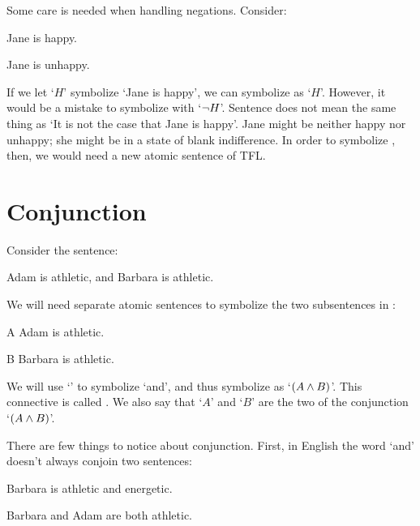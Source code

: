 Some care is needed when handling negations. Consider:
	\begin{earg}
		\item[\ex{not6}] Jane is happy.
		\item[\ex{not7}] Jane is unhappy.
	\end{earg}
If we let `$H$' symbolize  `Jane is happy', we can symbolize  as `$H$'. However, it would be a mistake to symbolize  with `$\neg{H}$'. Sentence  does not mean the same thing as `It is not the case that Jane is happy'. Jane might be neither happy nor unhappy; she might be in a state of blank indifference. In order to symbolize , then, we would need a new atomic sentence of TFL.

\section{Conjunction}\label{s:ConnectiveConjunction}

Consider the sentence:

	\begin{earg}
		\item[\ex{and3}]Adam is athletic, and Barbara is athletic.
	\end{earg}

We will need separate atomic sentences to symbolize the two subsentences in :

	\begin{ekey}
		\item[A] Adam is athletic.
		\item[B] Barbara is athletic.
	\end{ekey}

\noindent We will use `\eand' to symbolize `and', and thus symbolize  as `$(A\wedge B)$'. This connective is called . We also say that `$A$' and `$B$' are the two  of the conjunction `$(A \wedge B)$'.

There are few things to notice about conjunction.  First, in English the word `and' doesn't always conjoin two sentences:

	\begin{earg}
		\item[\ex{and4}]Barbara is athletic and energetic.
		\item[\ex{and5}]Barbara and Adam are both athletic.
	\end{earg}

